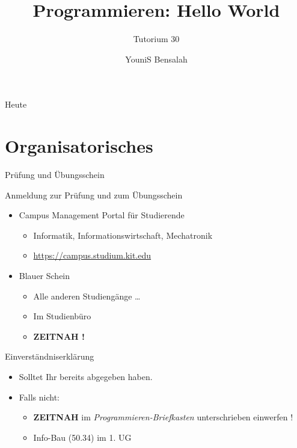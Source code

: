 \documentclass[18pt]{beamer}
\title[Hello World]{Programmieren: Hello World}
\subtitle{Tutorium 30}
\author{YouniS Bensalah}
\institute{Chair for Software Design and Quality}
\begin{document}

\begin{frame}
\titlepage
\end{frame}

\begin{frame}{Heute}
\tableofcontents
\end{frame}

\section{Organisatorisches}

\begin{frame}{Prüfung und Übungsschein}
    \begin{block}{Anmeldung zur Prüfung und zum Übungsschein}
        \begin{itemize}
            \item Campus Management Portal für Studierende
            \begin{itemize}
                \item Informatik, Informationswirtschaft, Mechatronik
                \item \url{https://campus.studium.kit.edu}
            \end{itemize}
            \pause

            \item Blauer Schein
            \begin{itemize}
                \item Alle anderen Studiengänge \dots
                \item Im Studienbüro
                \pause
                \item \textbf{ZEITNAH !}
            \end{itemize}
        \end{itemize}
    \end{block}
\end{frame}

\begin{frame}{Einverständniserklärung}
    \begin{itemize}
        \item Solltet Ihr bereits abgegeben haben.
        \pause
        \item Falls nicht:
        \begin{itemize}
            \item \textbf{ZEITNAH} im \textit{Programmieren-Briefkasten} unterschrieben einwerfen !
            \item Info-Bau (50.34) im 1. UG
        \end{itemize}
    \end{itemize}
\end{frame}
\end{document}
